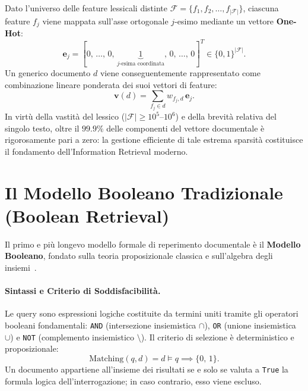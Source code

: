 Dato l'universo delle feature lessicali distinte $\mathcal{F} = \{f_1, f_2, \dots, f_{|\mathcal{F}|}\}$, ciascuna feature $f_j$ viene mappata sull'asse ortogonale $j$-esimo mediante un vettore \textbf{One-Hot}:
\begin{equation}
\mathbf{e}_j = [0, \, \dots, \, 0, \, \underbrace{1}_{j\text{-esima coordinata}}, \, 0, \, \dots, \, 0]^T \in \{0, 1\}^{|\mathcal{F}|}.
\end{equation}
Un generico documento $d$ viene conseguentemente rappresentato come combinazione lineare ponderata dei suoi vettori di feature:
\begin{equation}
\mathbf{v}(d) = \sum_{f_j \in d} w_{f_j, d} \, \mathbf{e}_j.
\end{equation}
In virt\`u della vastit\`a del lessico ($|\mathcal{F}| \ge 10^5\text{--}10^6$) e della brevit\`a relativa del singolo testo, oltre il $\mathbf{99.9\%}$ delle componenti del vettore documentale \`e rigorosamente pari a zero: la gestione efficiente di tale estrema sparsit\`a costituisce il fondamento dell'Information Retrieval moderno.

\FloatBarrier
\section{Il Modello Booleano Tradizionale (Boolean Retrieval)}
\label{sec:boolean-retrieval}
\label{sec:boolean-vs-ranked}

Il primo e pi\`u longevo modello formale di reperimento documentale \`e il \textbf{Modello Booleano}, fondato sulla teoria proposizionale classica e sull'algebra degli insiemi~\cite{manning2008}.

\paragraph{Sintassi e Criterio di Soddisfacibilit\`a.}
Le query sono espressioni logiche costituite da termini uniti tramite gli operatori booleani fondamentali: \texttt{AND} (intersezione insiemistica $\cap$), \texttt{OR} (unione insiemistica $\cup$) e \texttt{NOT} (complemento insiemistico $\setminus$).  
Il criterio di selezione \`e deterministico e proposizionale:
\begin{equation}
\text{Matching}(q, d) = d \models q \implies \{0, \, 1\}.
\end{equation}
Un documento appartiene all'insieme dei risultati se e solo se valuta a \texttt{True} la formula logica dell'interrogazione; in caso contrario, esso viene escluso.

